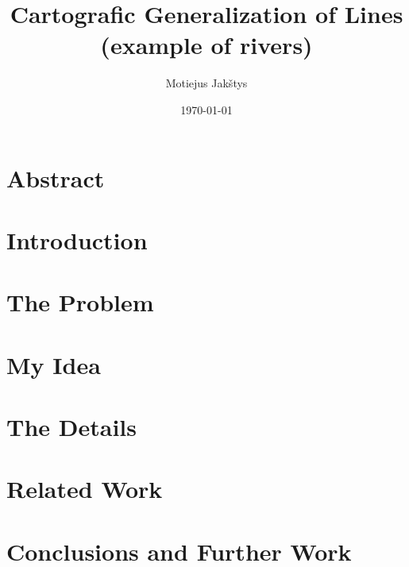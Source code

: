 \documentclass{article}
\title{
    Cartografic Generalization of Lines (example of rivers) \\ \vspace{4mm}
}
\author{Motiejus Jakštys}
\date{\today}
\begin{document}
\maketitle

\newpage

\section{Abstract}
\label{sec:abstract}

\section{Introduction}
\label{sec:introduction}

\section{The Problem}
\label{sec:the_problem}

\section{My Idea}
\label{sec:my_idea}

\section{The Details}
\label{sec:the_details}

\section{Related Work}
\label{sec:related_work}

\section{Conclusions and Further Work}
\label{sec:conclusions_and_further_work}

\printbibliography
\end{document}
